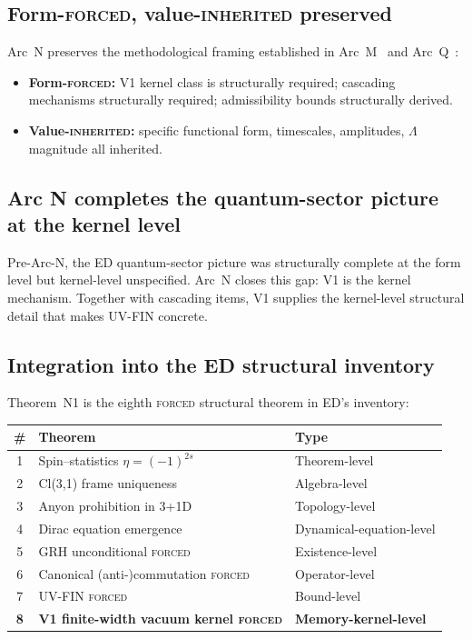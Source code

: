 \documentclass[11pt,a4paper]{article}
\begin{document}
\subsection{Form-\textsc{forced}, value-\textsc{inherited} preserved}

Arc~N preserves the methodological framing established in Arc~M~\cite{arcm} and Arc~Q~\cite{arcq}:
\begin{itemize}
  \item \textbf{Form-\textsc{forced}:} V1 kernel class is structurally required; cascading mechanisms structurally required; admissibility bounds structurally derived.
  \item \textbf{Value-\textsc{inherited}:} specific functional form, timescales, amplitudes, $\Lambda$ magnitude all inherited.
\end{itemize}

\subsection{Arc N completes the quantum-sector picture at the kernel level}

Pre-Arc-N, the ED quantum-sector picture was structurally complete at the form level but kernel-level unspecified. Arc~N closes this gap: V1 is the kernel mechanism. Together with cascading items, V1 supplies the kernel-level structural detail that makes UV-FIN concrete.

\subsection{Integration into the ED structural inventory}

Theorem~N1 is the eighth \textsc{forced} structural theorem in ED's inventory:
\begin{center}
\begin{tabular}{cll}
\hline
\# & Theorem & Type \\
\hline
1 & Spin--statistics $\eta = (-1)^{2s}$ & Theorem-level \\
2 & Cl(3,1) frame uniqueness & Algebra-level \\
3 & Anyon prohibition in 3+1D & Topology-level \\
4 & Dirac equation emergence & Dynamical-equation-level \\
5 & GRH unconditional \textsc{forced} & Existence-level \\
6 & Canonical (anti-)commutation \textsc{forced} & Operator-level \\
7 & UV-FIN \textsc{forced} & Bound-level \\
\textbf{8} & \textbf{V1 finite-width vacuum kernel \textsc{forced}} & \textbf{Memory-kernel-level} \\
\hline
\end{tabular}
\end{center}
\end{document}
